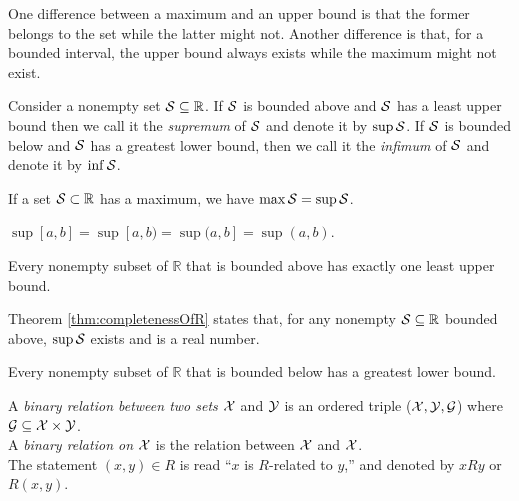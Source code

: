 \begin{rem}
One difference between a maximum and an upper bound
 is that the former belongs to the set
 while the latter might not.
Another difference is that,
 for a bounded interval,
 the upper bound always exists
 while the maximum might not exist.
\end{rem}

\begin{defn}
  Consider a nonempty set \mbox{${\cal S}\subseteq \mathbb{R}$}.
  If ${\cal S}$ is bounded above and ${\cal S}$
   has a least upper bound 
   then we call it the \emph{supremum}
   of ${\cal S}$
   and denote it by $\sup {\cal S}$.
  If ${\cal S}$ is bounded below and ${\cal S}$
   has a greatest lower bound,
   then we call it the \emph{infimum}
   of ${\cal S}$
   and denote it by $\inf {\cal S}$.
\end{defn}

\begin{exm}
  If a set ${\cal S}\subset \mathbb{R}$ has a maximum,
   we have \mbox{$\max{\cal S}=\sup {\cal S}$}.
\end{exm}

\begin{exm}
  $\sup[a,b]=\sup[a,b)=\sup(a,b]=\sup(a,b)$.
\end{exm}

\begin{thm}%
  \label{thm:completenessOfR}
  Every nonempty subset of $\mathbb{R}$ %
   that is bounded above has exactly one least upper bound.
\end{thm}

\begin{rem}
  Theorem \ref{thm:completenessOfR} states that, 
  for any nonempty ${\cal S}\subseteq \mathbb{R}$ bounded above,
  $\sup {\cal S}$ exists and is a real number.
\end{rem}

\begin{coro}
  Every nonempty subset of $\mathbb{R}$ %
  that is bounded below has a greatest lower bound.
\end{coro}

\begin{defn}
  A \emph{binary relation between two sets} ${\cal X}$ and ${\cal Y}$
  is an ordered triple
  (${\cal X}, {\cal Y}, {\cal G}$)
  where ${\cal G}\subseteq{\cal X}\times{\cal Y}$.\\
  A \emph{binary relation on} ${\cal X}$
  is the relation between ${\cal X}$ and ${\cal X}$.\\
  The statement $(x,y)\in R$ is read
  ``$x$ is $R$-related to $y$,'' and
  denoted by $xRy$ or $R(x,y)$.
\end{defn}

